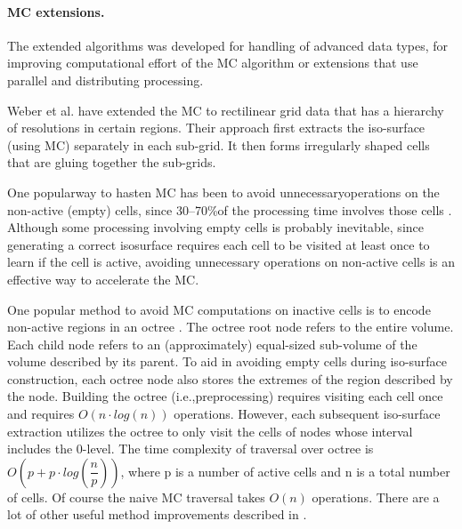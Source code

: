 \paragraph{MC extensions.}
The extended algorithms was developed for handling of advanced data types, for improving computational effort of the MC algorithm or extensions that use parallel and distributing processing.

Weber et al. \cite{WeberEtAl} have extended the MC to rectilinear grid data that has a hierarchy of resolutions in certain regions. Their approach first extracts the iso-surface (using MC) separately in each sub-grid. It then forms irregularly shaped cells that are gluing together  the sub-grids.

One popularway  to  hasten  MC  has  been  to  avoid  unnecessaryoperations on the non-active (empty) cells, since 30–70\%of the processing time involves those cells \cite{Wilhelms1990}. Although some processing involving empty cells is probably inevitable, since generating a correct isosurface requires each cell to be visited at least once to learn if the cell is active, avoiding unnecessary operations on non-active cells is an effective way to accelerate the MC.

One popular method to avoid MC computations on inactive cells is to encode non-active regions in an octree \cite{WilhelmsGelder}. The octree root node refers to the entire volume. Each child node refers to an (approximately) equal-sized sub-volume of the volume described by its parent. To aid in avoiding empty cells during iso-surface construction, each octree node also stores the extremes of the region described by the node. Building the octree (i.e.,preprocessing) requires visiting each cell once and requires $O(n\cdot log(n))$ operations. However, each subsequent iso-surface extraction utilizes the octree to only visit the cells of nodes whose interval includes the 0-level. The time complexity of traversal over octree is $O\left(p + p\cdot log\left(\dfrac{n}{p}\right)\right)$, where p is a number of active cells and n is a total number of cells. Of course the naive MC traversal takes $O(n)$ operations. There are a lot of other useful method improvements described in \cite{MCSurvey}.